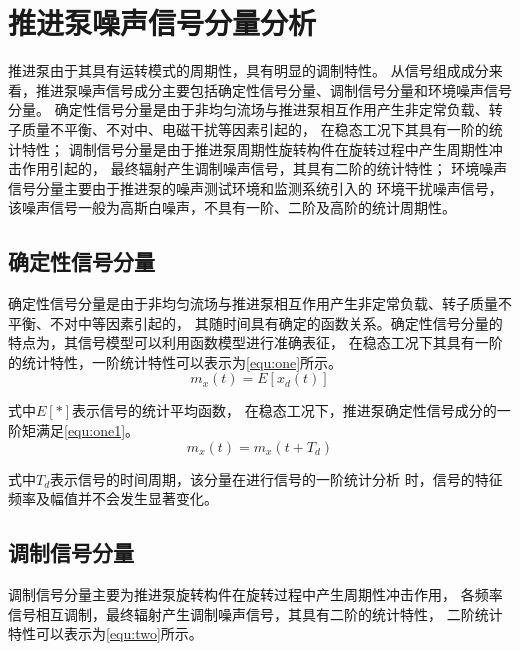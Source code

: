 \section{推进泵噪声信号分量分析}
推进泵由于其具有运转模式的周期性，具有明显的调制特性。
从信号组成成分来看，推进泵噪声信号成分主要包括确定性信号分量、调制信号分量和环境噪声信号分量。
确定性信号分量是由于非均匀流场与推进泵相互作用产生非定常负载、转子质量不平衡、不对中、电磁干扰等因素引起的，
在稳态工况下其具有一阶的统计特性；
调制信号分量是由于推进泵周期性旋转构件在旋转过程中产生周期性冲击作用引起的，
最终辐射产生调制噪声信号，其具有二阶的统计特性；
环境噪声信号分量主要由于推进泵的噪声测试环境和监测系统引入的
环境干扰噪声信号，该噪声信号一般为高斯白噪声，不具有一阶、二阶及高阶的统计周期性\cite{song2019}。
\begin{comment}
推进泵噪声信号模型可以利用\autoref{fig:signal_modle}进行表示。
\begin{figure}[htbp]
    \centering
    \texttt{[image: 5推进泵信号模型.png]}
    \caption{\label{fig:signal_modle}推进泵噪声信号模型}
\end{figure}
\end{comment}

\subsection{确定性信号分量}
确定性信号分量是由于非均匀流场与推进泵相互作用产生非定常负载、转子质量不平衡、不对中等因素引起的，
其随时间具有确定的函数关系。确定性信号分量的特点为，其信号模型可以利用函数模型进行准确表征，
在稳态工况下其具有一阶的统计特性，一阶统计特性可以表示为\autoref{equ:one}所示。
\begin{equation}
    \label{equ:one}
    m_{x}\left ( t \right ) =E\left [ x_{d}\left ( t   \right )  \right ]
\end{equation}

式中$E[*]$表示信号的统计平均函数，
在稳态工况下，推进泵确定性信号成分的一阶矩满足\autoref{equ:one1}。
\begin{equation}
    \label{equ:one1}
    m_{x}\left ( t \right ) =m_{x}\left ( t+T_d \right )
\end{equation}

式中$T_{d}$表示信号的时间周期，该分量在进行信号的一阶统计分析
时，信号的特征频率及幅值并不会发生显著变化。
\subsection{调制信号分量}
调制信号分量主要为推进泵旋转构件在旋转过程中产生周期性冲击作用，
各频率信号相互调制，最终辐射产生调制噪声信号，其具有二阶的统计特性，
二阶统计特性可以表示为\autoref{equ:two}所示。

